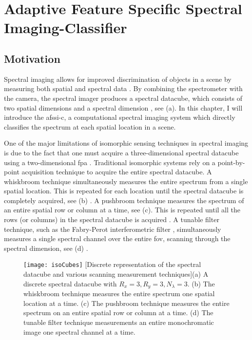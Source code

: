 \chapter{Adaptive Feature Specific Spectral Imaging-Classifier}\label{chap:Afssic}


\section{Motivation}

Spectral imaging allows for improved discrimination of objects in a scene by measuring both spatial and spectral data \cite{chang2003hyperspectral, ibrahim2010spectral, shaw2003spectral}. By combining the spectrometer with the camera, the spectral imager produces a spectral datacube, which consists of two spatial dimensions and a spectral dimension \cite{garini2006spectral,eismann2012hyperspectral}, see (a).  In this chapter, I will introduce the \acrfull{afssi-c}, a computational spectral imaging system which directly classifies the spectrum at each spatial location in a scene.

One of the major limitations of \gls{isomorphic} sensing techniques in spectral imaging is due to the fact that one must acquire a three-dimensional spectral datacube using a two-dimensional \acrfull{fpa} \cite{garini2006spectral}. Traditional isomorphic systems rely on a point-by-point acquisition technique to acquire the entire spectral datacube. A \gls{whiskbroom} technique simultaneously measures the entire spectrum from a single spatial location. This is repeated for each location until the spectral datacube is completely acquired, see (b) \cite{wolfe1997introduction}. A \gls{pushbroom} technique measures the spectrum of an entire spatial row or column at a time, see (c). This is repeated until all the rows (or columns) in the spectral datacube is acquired \cite{yang2003ccd, wolfe1997introduction}. A \gls{tunable filter} technique, such as the Fabry-Perot interferometric filter \cite{fabry1897franges, perot1899application, fabry1901new}, simultaneously measures a single spectral channel  over the entire \gls{fov}, scanning through the spectral dimension, see (d) \cite{gat2000imaging}. 

\begin{figure}[htb]
	\texttt{[image: isoCubes]}
	[Discrete representation of the spectral datacube and various scanning measurement techniques]{(a) A discrete spectral datacube with $R_x = 3, R_y = 3, N_{\lambda} = 3$. (b) The whiskbroom technique measures the entire spectrum one spatial location at a time. (c) The pushbroom technique measures the entire spectrum on an entire spatial row or column at a time. (d) The tunable filter technique measurements an entire monochromatic image one spectral channel at a time.}
	\label{fig:isoCubes}
\end{figure}


